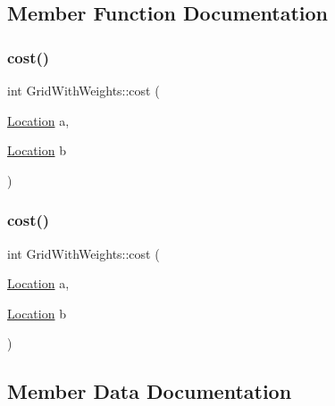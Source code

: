 \subsection{Member Function Documentation}
\mbox{\label{structGridWithWeights_a999c39922a9b507e4436b817592a7ff9}} 
\subsubsection{\texorpdfstring{cost()}{cost()}\hspace{0.1cm}{\footnotesize\ttfamily [1/2]}}
{\footnotesize\ttfamily int Grid\+With\+Weights\+::cost (\begin{DoxyParamCaption}\item[{\mbox{\hyperlink{structSquareGrid_a2c9a2cbd3912aa48ac97289abc3f1c0f}{Location}}}]{a,  }\item[{\mbox{\hyperlink{structSquareGrid_a2c9a2cbd3912aa48ac97289abc3f1c0f}{Location}}}]{b }\end{DoxyParamCaption})\hspace{0.3cm}{\ttfamily [inline]}}

\mbox{\label{structGridWithWeights_a999c39922a9b507e4436b817592a7ff9}} 
\subsubsection{\texorpdfstring{cost()}{cost()}\hspace{0.1cm}{\footnotesize\ttfamily [2/2]}}
{\footnotesize\ttfamily int Grid\+With\+Weights\+::cost (\begin{DoxyParamCaption}\item[{\mbox{\hyperlink{structSquareGrid_a2c9a2cbd3912aa48ac97289abc3f1c0f}{Location}}}]{a,  }\item[{\mbox{\hyperlink{structSquareGrid_a2c9a2cbd3912aa48ac97289abc3f1c0f}{Location}}}]{b }\end{DoxyParamCaption})\hspace{0.3cm}{\ttfamily [inline]}}



\subsection{Member Data Documentation}
\mbox{\label{structGridWithWeights_a03137c824b8c63cdeed414ef40f5b504}} 

